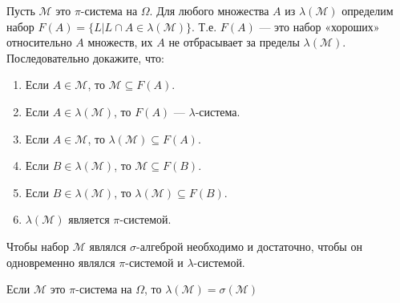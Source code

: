 \begin{problem}
Пусть $\mathcal{M}$ это $\pi$-система на $\Omega$. Для любого
множества $A$ из $\lambda(\mathcal{M})$ определим набор
$F(A)=\{L|L\cap A \in \lambda(\mathcal{M})\}$. Т.е. $F(A)$ — это
набор «хороших» относительно $A$ множеств, их $A$ не отбрасывает
за пределы $\lambda(\mathcal{M})$. \\
Последовательно докажите, что:
\begin{enumerate}
\item Если $A \in \mathcal{M}$, то $\mathcal{M}\subseteq F(A)$.
\item Если $A\in\lambda(\mathcal{M})$, то $F(A)$ — $\lambda$-система.
\item Если $A \in \mathcal{M}$, то $\lambda(\mathcal{M})\subseteq
F(A)$.
\item Если $B\in \lambda(\mathcal{M})$, то $\mathcal{M}\subseteq
F(B)$.
\item Если $B\in \lambda(\mathcal{M})$, то
$\lambda(\mathcal{M})\subseteq
F(B)$.
\item $\lambda(\mathcal{M})$ является $\pi$-системой.
\end{enumerate}

\begin{sol}

\end{sol}
\end{problem}

\begin{problem}
Чтобы набор $\mathcal{M}$ являлся $\sigma$-алгеброй необходимо и
достаточно, чтобы он одновременно являлся $\pi$-системой и
$\lambda$-системой.

\begin{sol}

\end{sol}
\end{problem}

\begin{problem}
Если $\mathcal{M}$ это $\pi$-система на $\Omega$, то
$\lambda(\mathcal{M})=\sigma(\mathcal{M})$

\begin{sol}

\end{sol}
\end{problem}

